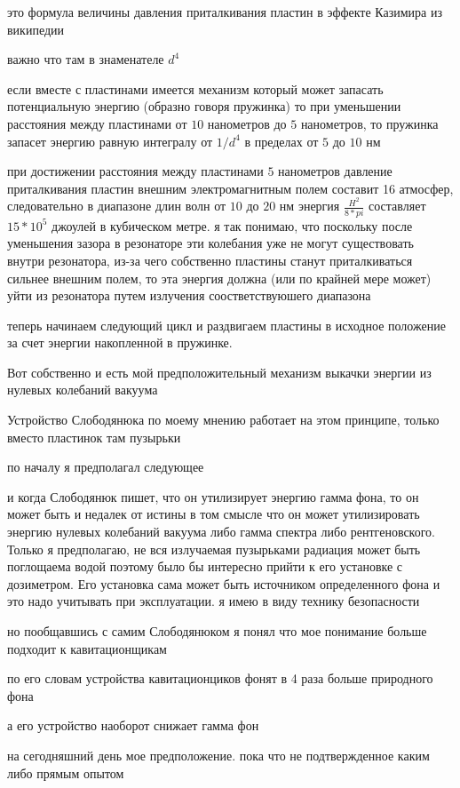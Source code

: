 \documentclass[12pt, letterpaper]{article}
\begin{document}
это формула величины давления приталкивания  пластин в эффекте Казимира из википедии

важно что там в знаменателе $d^4$

если вместе с пластинами имеется механизм который может запасать потенциальную энергию (образно говоря пружинка) то при уменьшении расстояния между пластинами от $10$ нанометров до $5$ нанометров, то пружинка запасет энергию равную интегралу от $1/d^4$ в пределах от $5$ до $10$ нм

при достижении расстояния между пластинами $5$ нанометров давление приталкивания пластин внешним электромагнитным полем составит 16 атмосфер, следовательно в диапазоне длин волн от $10$ до $20$ нм энергия $\frac{H^2}{8*pi}$ составляет $15 * 10^5$ джоулей в кубическом метре. я так понимаю, что поскольку после уменьшения зазора в резонаторе эти колебания уже не могут существовать внутри резонатора, из-за чего собственно пластины станут приталкиваться сильнее внешним полем, то эта энергия должна (или по крайней мере может) уйти из резонатора путем излучения соостветствуюшего диапазона


теперь начинаем следующий цикл и раздвигаем пластины в исходное положение за счет энергии накопленной в пружинке.

Вот собственно и есть мой предположительный механизм выкачки энергии из нулевых колебаний вакуума


Устройство Слободянюка по моему мнению работает на этом принципе, только вместо пластинок там пузырьки

по началу я предполагал следующее

и когда Слободянюк пишет, что он утилизирует энергию гамма фона, то он может быть и недалек от истины в том смысле что он может утилизировать энергию нулевых колебаний вакуума либо гамма спектра либо рентгеновского. Только я предполагаю, не вся излучаемая пузырьками радиация может быть поглощаема водой поэтому было бы интересно прийти к его установке с дозиметром. Его установка сама может быть источником определенного фона и это надо учитывать при эксплуатации. я имею в виду технику безопасности

но пообщавшись с самим Слободянюком я понял что мое понимание больше подходит к кавитационщикам

по его словам устройства кавитационциков фонят в 4 раза больше природного фона

а его устройство наоборот снижает гамма фон

 на сегодняшний день мое предположение. пока что не подтвержденное каким либо прямым опытом
\end{document}
